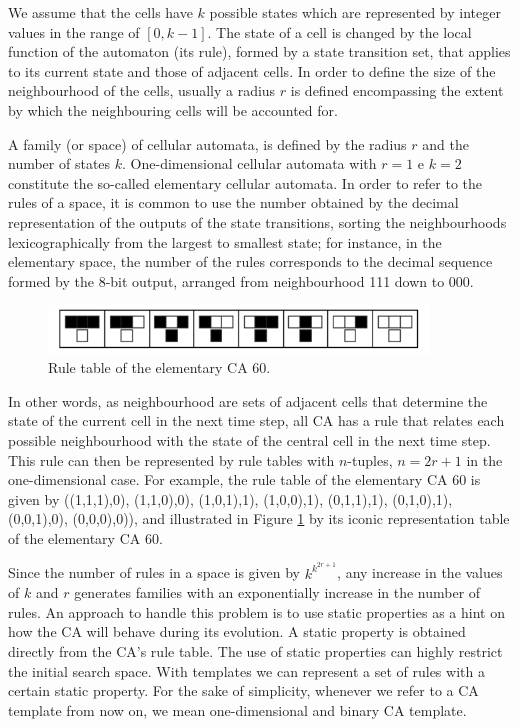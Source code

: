 \documentclass{llncs}
\begin{document}
We assume that the cells have $k$ possible states which are represented by integer values in the range of $[0, k-1]$. The state of a cell is changed by the local function of the automaton (its rule), formed by a state transition set, that applies to its current state and those of adjacent cells. In order to define the size of the neighbourhood of the cells, usually a radius $r$ is defined encompassing the extent by which the neighbouring cells will be accounted for.

A family (or space) of cellular automata, is defined by the radius $r$ and the number of states $k$. One-dimensional cellular automata with $r=1$ e $k=2$ constitute the so-called elementary cellular automata. In order to refer to the rules of a space, it is common to use the number obtained by the decimal representation of the outputs of the state transitions, sorting the neighbourhoods lexicographically from the largest to smallest state; for instance, in the elementary space, the number of the rules corresponds to the decimal sequence formed by the 8-bit output, arranged from neighbourhood 111 down to 000. 

\begin{figure}
  \centering
  \includegraphics[width=0.9\textwidth]{Figure1.pdf}
  \caption{Rule table of the elementary CA 60.}
  \label{fig:table60}
\end{figure}

In other words, as neighbourhood are sets of adjacent cells that determine the state of the current cell in the next time step, all CA has a rule that relates each possible neighbourhood with the state of the central cell in the next time step. This rule can then be represented by rule tables with $n$-tuples, $n = 2r + 1$  in the one-dimensional case. For example, the rule table of the elementary CA 60 is given by 
((1,1,1),0), (1,1,0),0), (1,0,1),1), (1,0,0),1), (0,1,1),1), (0,1,0),1), (0,0,1),0), (0,0,0),0)), and illustrated in Figure \ref{fig:table60} by its iconic representation table of the elementary CA 60.

Since the number of rules in a space is given by $k^{k^{2r+1}}$, any increase in the values of $k$ and $r$ generates families with an exponentially increase in the number of rules. An approach to handle this problem is to use static properties as a hint on how the CA will behave during its evolution. A static property is obtained directly from the CA's rule table. The use of static properties can highly restrict the initial search space. With templates we can represent a set of rules with a certain static property. For the sake of simplicity, whenever we refer to a CA template from now on, we mean one-dimensional and binary CA template.
\end{document}
